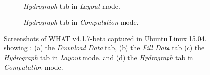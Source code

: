 \documentclass[WHATMANUAL.tex]{subfiles}
\begin{document}
\begin{figure}[!h]
\begin{subfigure}[t]{0.45\textwidth}
        \label{subfig:ScnShot_001}
    \end{subfigure}
    \\[0.5cm]
    \begin{subfigure}[t]{0.45\textwidth}
        \setlength{\fboxsep}{0pt}
        \caption{\emph{Hydrograph} tab in \emph{Layout} mode.}
        \label{subfig:ScnShot_002}
    \end{subfigure}
    \hspace{0.5cm}
    \begin{subfigure}[t]{0.45\textwidth}
        \setlength{\fboxsep}{0pt}
        \caption{\emph{Hydrograph} tab in \emph{Computation} mode.}
        \label{subfig:ScnShot_003}
    \end{subfigure}
    \caption[Screenshots of WHAT v4.1.7-beta captured in Ubuntu Linux 15.04.]{Screenshots of WHAT v4.1.7-beta captured in Ubuntu Linux 15.04. showing : (a) the \emph{Download Data} tab, (b) the \emph{Fill Data} tab (c) the \emph{Hydrograph} tab in \emph{Layout} mode, and (d) the \emph{Hydrograph} tab in \emph{Computation} mode.}
    \label{fig:WHAT_GUI_ScnShot}
\end{figure}
\end{document}

